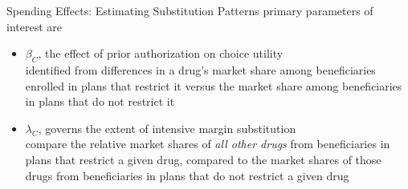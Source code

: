 \begin{frame}{Spending Effects: Estimating Substitution Patterns}
    primary parameters of interest are 
    \begin{itemize}
        \item $\beta_C$, the effect of prior authorization on choice utility \\
        identified from differences in a drug’s market share among beneficiaries enrolled in plans that restrict it versus the market share among beneficiaries in plans that do not restrict it
        \item $\lambda_C$, governs the extent of intensive margin substitution \\
     compare the relative market shares of \textit{all other drugs} from beneficiaries in plans that restrict a given drug, compared to the market shares of those drugs from beneficiaries in plans that do not restrict a given drug
    \end{itemize}
  

\end{frame}